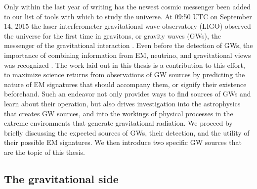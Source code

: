 Only within the last year of writing has the newest cosmic messenger been
added to our list of tools with which to study the universe. At 09:50 UTC on
September 14, 2015 the laser interferometer gravitational wave observatory
(LIGO) observed the universe for the first time in gravitons, or gravity waves
(GWs), the messenger of the gravitational interaction \citep{GW150914:2016}.
Even before the detection of GWs, the importance of combining information from
EM, neutrino, and gravitational views was recognized
\citep[\textit{e.g.}][]{ThorneBraginsky:1976,Phinney:2009, GW+Neutrino:2010}.
The work laid out in this thesis is a contribution to this effort, to maximize
science returns from observations of GW sources by predicting the nature of EM
signatures that should accompany them, or signify their existence beforehand.
Such an endeavor not only provides ways to find sources of GWs and learn about
their operation, but also drives investigation into the astrophysics that
creates GW sources, and into the workings of physical processes in the extreme
environments that generate gravitational radiation. We proceed by briefly
discussing the expected sources of GWs, their detection, and the utility of
their possible EM signatures. We then introduce two specific GW sources that
are the topic of this thesis.



\subsection{The gravitational side} 

